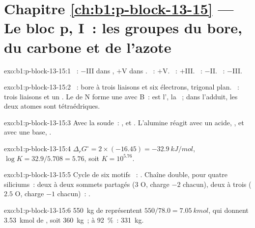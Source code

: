 \section*{Chapitre \ref{ch:b1:p-block-13-15} --- Le bloc p, I~: les groupes du bore, du carbone et de l'azote}

\begin{solution}{exo:b1:p-block-13-15:1}
~: $-$III dans , $+$V dans . ~: $+$V.
~: $+$III. ~: $-$II. ~: $-$III.
\end{solution}

\begin{solution}{exo:b1:p-block-13-15:2}
~: bore à trois liaisons et six électrons, trigonal plan.
~: trois liaisons et un . Le 
de N forme une  avec B~:  est l',
 la ~; dans l'adduit, les deux atomes sont
tétraédriques.
\end{solution}

\begin{solution}{exo:b1:p-block-13-15:3}
Avec la soude~: ,
 et
. L'alumine réagit avec un acide,
, et avec une base,
.
\end{solution}

\begin{solution}{exo:b1:p-block-13-15:4}
$\Delta_r G^\circ = 2 \times (-16.45) = \qty{-32.9}{kJ/mol}$, $\log K =
32.9/5.708 = 5.76$, soit $K = 10^{5.76}$.
\end{solution}

\begin{solution}{exo:b1:p-block-13-15:5}
Cycle de six motifs ~: . Chaîne double, pour
quatre siliciums~: deux à deux sommets partagés (3 O, charge $-2$
chacun), deux à trois ($2.5$ O, charge $-1$ chacun)~: .
\end{solution}

\begin{solution}{exo:b1:p-block-13-15:6}
\qty{550}{kg} de  représentent $550/78.0 = \qty{7.05}{kmol}$,
qui donnent
\qty{3.53}{kmol} de , soit \qty{360}{kg}~; à \qty{92}{\percent}~:
\qty{331}{kg}.
\end{solution}

